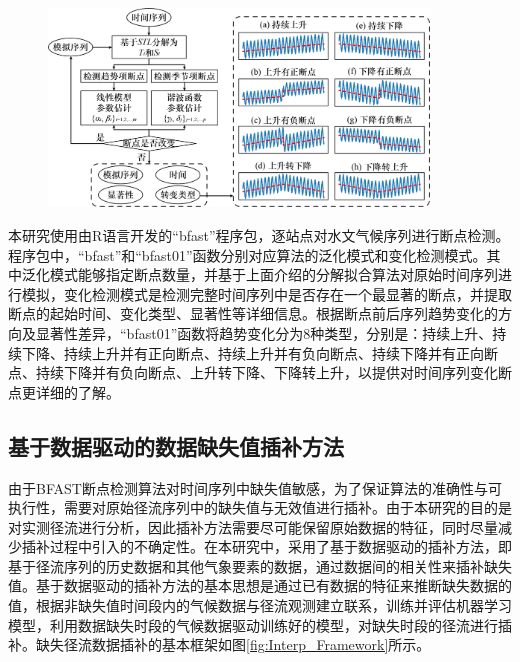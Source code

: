 \begin{figure}[H]
	\centering
	\includegraphics[width=0.9\textwidth]{figures/chap3/0_BFAST_Intro.jpg}
	\label{fig:BFAST_intro}
\end{figure}

本研究使用由R语言开发的“bfast”程序包，逐站点对水文气候序列进行断点检测。程序包中，“bfast”和“bfast01”函数分别对应算法的泛化模式和变化检测模式。其中泛化模式能够指定断点数量，并基于上面介绍的分解拟合算法对原始时间序列进行模拟，变化检测模式是检测完整时间序列中是否存在一个最显著的断点，并提取断点的起始时间、变化类型、显著性等详细信息\cite{JiangPing19822015NianZhongGuoZhiBeiFuGaiBianHuaJiQiDuiQiHouBianHuaDeMinGanXingFenXi2022}。根据断点前后序列趋势变化的方向及显著性差异，“bfast01”函数将趋势变化分为8种类型，分别是：持续上升、持续下降、持续上升并有正向断点、持续上升并有负向断点、持续下降并有正向断点、持续下降并有负向断点、上升转下降、下降转上升，以提供对时间序列变化断点更详细的了解。\par

\subsection{基于数据驱动的数据缺失值插补方法}

由于BFAST断点检测算法对时间序列中缺失值敏感，为了保证算法的准确性与可执行性，需要对原始径流序列中的缺失值与无效值进行插补。由于本研究的目的是对实测径流进行分析，因此插补方法需要尽可能保留原始数据的特征，同时尽量减少插补过程中引入的不确定性。在本研究中，采用了基于数据驱动的插补方法，即基于径流序列的历史数据和其他气象要素的数据，通过数据间的相关性来插补缺失值。基于数据驱动的插补方法的基本思想是通过已有数据的特征来推断缺失数据的值，根据非缺失值时间段内的气候数据与径流观测建立联系，训练并评估机器学习模型，利用数据缺失时段的气候数据驱动训练好的模型，对缺失时段的径流进行插补。缺失径流数据插补的基本框架如图\ref{fig:Interp_Framework}所示。\par

